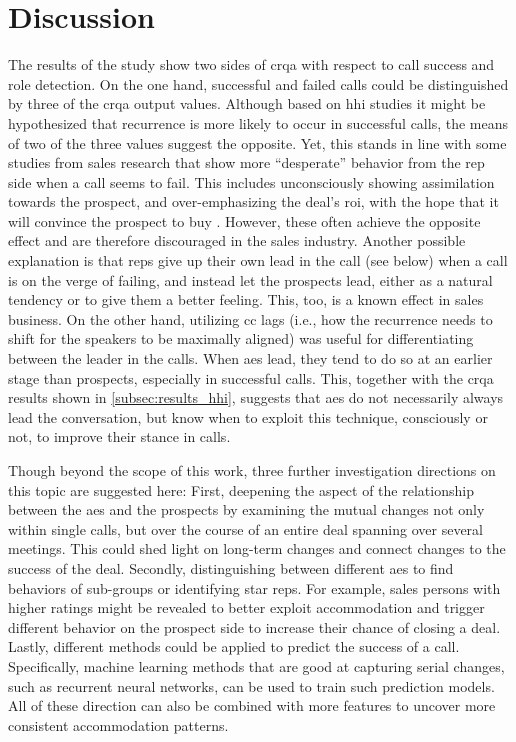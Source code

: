 \section{Discussion}
\label{sec:discussion_hhi}

The results of the study show two sides of \ac{crqa} with respect to call success and role detection.
On the one hand, successful and failed calls could be distinguished by three of the \ac{crqa} output values.
Although based on \ac{hhi} studies it might be hypothesized that recurrence is more likely to occur in successful calls, the means of two of the three values suggest the opposite.
Yet, this stands in line with some studies from sales research that show more \enquote{desperate} behavior from the rep side when a call seems to fail.
This includes unconsciously showing assimilation towards the prospect, and over-emphasizing the deal's \ac{roi}, with the hope that it will convince the prospect to buy \citep{Orlob2018roi}.
However, these often achieve the opposite effect and are therefore discouraged in the sales industry.
Another possible explanation is that reps give up their own lead in the call (see below) when a call is on the verge of failing, and instead let the prospects lead, either as a natural tendency or to give them a better feeling.
This, too, is a known effect in sales business.
On the other hand, utilizing \acl{cc} lags (i.e., how the recurrence needs to shift for the speakers to be maximally aligned) was useful for differentiating between the leader in the calls.
When \acp{ae} lead, they tend to do so at an earlier stage than prospects, especially in successful calls.
This, together with the \ac{crqa} results shown in \cref{subsec:results_hhi}, suggests that \acp{ae} do not necessarily always lead the conversation, but know when to exploit this technique, consciously or not, to improve their stance in calls.

Though beyond the scope of this work, three further investigation directions on this topic are suggested here:
First, deepening the aspect of the relationship between the \acp{ae} and the prospects by examining the mutual changes not only within single calls, but over the course of an entire deal spanning over several meetings.
This could shed light on long-term changes and connect changes to the success of the deal.
Secondly, distinguishing between different \acp{ae} to find behaviors of sub-groups or identifying star reps.
For example, sales persons with higher ratings might be revealed to better exploit accommodation and trigger different behavior on the prospect side to increase their chance of closing a deal.
Lastly, different methods could be applied to predict the success of a call.
Specifically, machine learning methods that are good at capturing serial changes, such as recurrent neural networks, can be used to train such prediction models.
All of these direction can also be combined with more features to uncover more consistent accommodation patterns.

